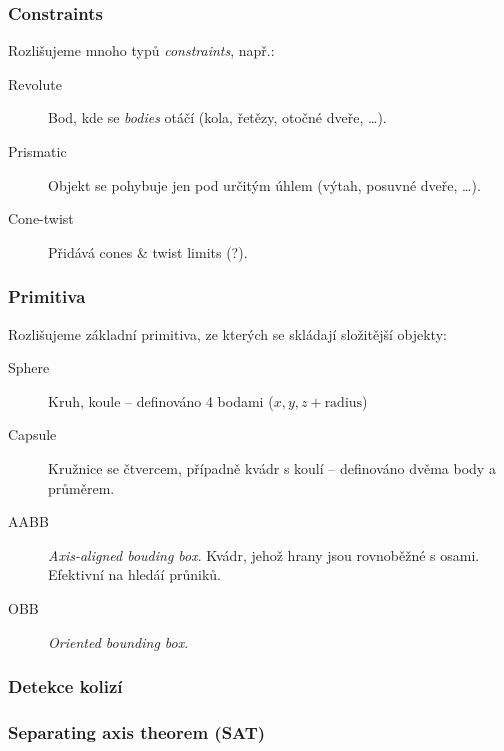 \subsubsection*{Constraints}

Rozlišujeme mnoho typů \textit{constraints}, např.:

\begin{description}
    \item[Revolute] Bod, kde se \textit{bodies} otáčí (kola, řetězy, otočné dveře, \dots).
    \item[Prismatic] Objekt se pohybuje jen pod určitým úhlem (výtah, posuvné dveře, \dots).
    \item[Cone-twist] Přidává cones \& twist limits (?).
\end{description}


\subsubsection*{Primitiva}

Rozlišujeme základní primitiva, ze kterých se skládají složitější objekty:

\begin{description}
    \item[Sphere] Kruh, koule -- definováno 4 bodami (\(x, y, z + \textrm{radius}\))
    \item[Capsule] Kružnice se čtvercem, případně kvádr s koulí -- definováno dvěma body a průměrem.
    \item[AABB] \textit{Axis-aligned bouding box}. Kvádr, jehož hrany jsou rovnoběžné s osami. Efektivní na hledáí průniků.
    \item[OBB] \textit{Oriented bounding box}.
\end{description}


\subsubsection*{Detekce kolizí}

\medskip

\subsubsection*{Separating axis theorem (SAT)}

